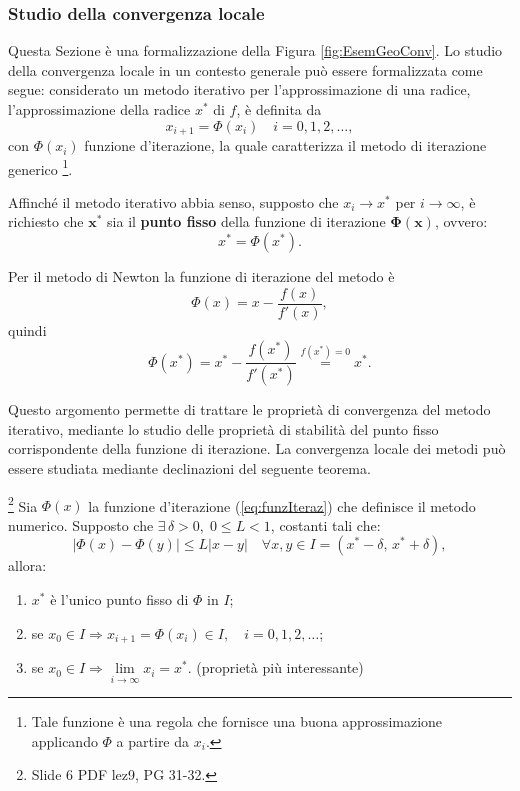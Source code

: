 \subsubsection{Studio della convergenza locale}
Questa Sezione è una formalizzazione della Figura \ref{fig:EsemGeoConv}.
Lo studio della convergenza locale in un contesto generale può essere formalizzata come segue: considerato un metodo iterativo per l'approssimazione di una radice, l'approssimazione della radice $x^*$ di $f$, è definita da
\begin{equation}\label{eq:funzIteraz}
	x_{i+1}=\Phi (x_i)\quad i=0,1,2,\hdots,
\end{equation}
con $\Phi (x_i)$ funzione d'iterazione, la quale caratterizza il metodo di iterazione generico \footnote{Tale funzione è una regola che fornisce una buona approssimazione applicando $\Phi$ a partire da $x_i$.}.

Affinché il metodo iterativo abbia senso, supposto che $x_i\rightarrow x^*$ per $i\rightarrow\infty$, è richiesto che $\boldsymbol{x^*}$ sia il \textbf{punto fisso} della funzione di iterazione $\boldsymbol{\Phi(x)}$, ovvero:
\begin{equation*}
	x^*=\Phi (x^*).
\end{equation*}

\begin{definition}
	Per il metodo di Newton la funzione di iterazione del metodo è
	\begin{equation}\label{eq:funzIterazNewton}
		\Phi (x)=x-\frac{f(x)}{f'(x)},
	\end{equation}
	quindi
	\begin{equation*}
		\Phi (x^*)=x^*-\frac{f(x^*)}{f'(x^*)}\overset{f(x^*)=0}{=}x^*.
	\end{equation*}
\end{definition}

Questo argomento permette di trattare le proprietà di convergenza del metodo iterativo, mediante lo studio delle proprietà di stabilità del punto fisso corrispondente della funzione di iterazione. La convergenza locale dei metodi può essere studiata mediante declinazioni del seguente teorema.

\begin{theorem}\label{th:puntofisso}
	\footnote{Slide 6 PDF lez9, PG 31-32.}
	Sia $\Phi(x)$ la funzione d'iterazione (\ref{eq:funzIteraz}) che definisce il metodo numerico. Supposto che $\exists\,\delta >0,\; 0\leq L<1$, costanti tali che:
	\begin{equation*}
		|\Phi (x)-\Phi (y)|\leq L|x-y| \quad\forall x,y \in I=(x^*-\delta,\, x^*+\delta),
	\end{equation*}
	allora:
	\begin{enumerate}
		\item $x^*$ è l'unico punto fisso di $\Phi$ in $I$;
		\item se $x_0 \in I\Rightarrow x_{i+1} = \Phi(x_i)\in I,\quad i=0,1,2,\hdots$;
		\item se $x_0\in I \Rightarrow \underset{{i\to\infty}}{\lim}{x_i}=x^*$. (proprietà più interessante)
	\end{enumerate}
\end{theorem}

